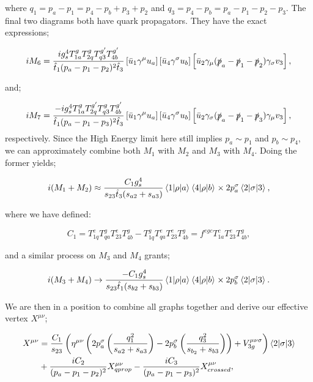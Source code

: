 where $q_1 = p_a - p_1 = p_4 - p_b + p_3 + p_2 $ and $q_3 = p_4 - p_b = p_a - p_1 - p_2 - p_3$. The final two diagrams both have quark propagators. They have the exact expressions;

\begin{equation}
iM_6 = \frac{i g_s^4 T^g_{1a} T^{g}_{2q} T^{g'}_{q3}  T^{g'}_{4b}}{\hat{t}_1 (p_a-p_1-p_2)^2 \hat{t}_3}\left[\bar{u}_1 \gamma^\mu u_a \right] \left[\bar{u}_4 \gamma^\sigma u_b \right] \left[\bar{u}_2 \gamma_\mu(\slashed{p}_a - \slashed{p}_1 -\slashed{p}_2) \gamma_\sigma v_3 \right],
\end{equation}

and;

\begin{equation}
iM_7 = \frac{-i g_s^4 T^g_{1a} T^{g'}_{2q} T^{g}_{q3}  T^{g'}_{4b}}{\hat{t}_1 (p_a-p_1-p_3)^2 \hat{t}_3}\left[\bar{u}_1 \gamma^\mu u_a \right] \left[\bar{u}_4 \gamma^\sigma u_b \right] \left[\bar{u}_2 \gamma_\sigma(\slashed{p}_a - \slashed{p}_1 -\slashed{p}_3) \gamma_\mu v_3 \right],
\end{equation}
respectively. Since the High Energy limit here still implies $p_a \sim p_1$ and $p_b \sim p_4$, we can approximately combine both $M_1$ with $M_2$ and $M_3$ with $M_4$. Doing the former yields;

\begin{equation}
i(M_1 + M_2) \approx \frac{ C_1 g_s^4}{s_{23} \hat{t}_3 (s_{a2} + s_{a3})} \mathinner{\langle1\vert\rho\vert a\rangle}_{} \mathinner{\langle4\vert\rho\vert b\rangle}_{} \times 2 p_a^\sigma \mathinner{\langle2\vert\sigma\vert3\rangle}_{},
\end{equation} 

where we have defined:

\begin{equation}
C_1 = T^e_{1q}T^g_{qa} T^e_{23}T^g_{4b} - T^g_{1q}T^e_{qa}T^e_{23}T^g_{4b} = f^{egc}T^c_{1a}T^e_{23}T^g_{4b},
\end{equation}

and a similar process on $M_3$ and $M_4$ grants;

\begin{equation}
i(M_3 + M_4) \to \frac{-C_1 g_s^4}{s_{23}\hat{t}_1 (s_{b2}+s_{b3})} \mathinner{\langle1\vert\rho\vert a\rangle}_{} \mathinner{\langle4\vert\rho\vert b\rangle}_{} \times 2 p_b^\sigma \mathinner{\langle2\vert\sigma\vert3\rangle}_{}. 
\end{equation}

We are then in a position to combine all graphs together and derive our effective vertex $X^{\mu \nu}$;

\begin{equation}
\begin{split}
X^{\mu \nu} &=  \frac{C_1}{s_{23}}\left(\eta^{\mu \nu}\left(2 p_a^\sigma \left( \frac{q_1^2}{s_{a2}+s_{a3}} \right) - 2 p_b^\sigma \left(\frac{q_3^2}{s_{b_2}+s_{b3}} \right) \right)+ V_{3g}^{\mu \nu \sigma} \right)\mathinner{\langle2\vert\sigma\vert3\rangle}_{} \\
&+ \frac{i C_2}{(p_a-p_1-p_2)^2} X_{qprop}^{\mu \nu} - \frac{i C_3}{(p_a-p_1-p_3)^2} X_{crossed}^{\mu \nu},
\end{split}
\end{equation}

